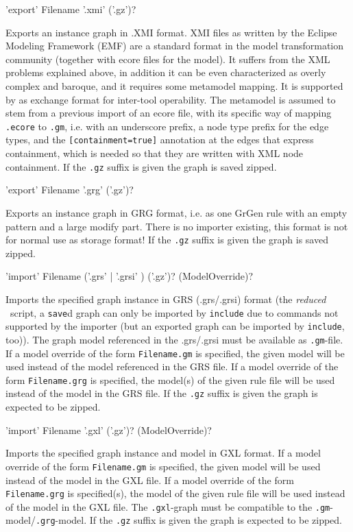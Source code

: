 \begin{rail}
  'export' Filename '.xmi' ('.gz')?
\end{rail}
Exports an instance graph in .XMI format.
XMI files as written by the Eclipse Modeling Framework (EMF) are a standard format in the model transformation community (together with ecore files for the model).
It suffers from the XML problems explained above, in addition it can be even characterized as overly complex and baroque, and it requires some metamodel mapping.
It is supported by \GrG{} as exchange format for inter-tool operability.
The metamodel is assumed to stem from a previous import of an ecore file, with its specific way of mapping \texttt{.ecore} to \texttt{.gm}, i.e. with an underscore prefix, a node type prefix for the edge types, and the \verb#[containment=true]# annotation at the edges that express containment, which is needed so that they are written with XML node containment.
If the \texttt{.gz} suffix is given the graph is saved zipped.


\begin{rail}
  'export' Filename '.grg' ('.gz')?
\end{rail}
Exports an instance graph in GRG format, i.e. as one GrGen rule with an empty pattern and a large modify part.
There is no importer existing, this format is not for normal use as storage format!
If the \texttt{.gz} suffix is given the graph is saved zipped.

\begin{rail}
  'import' Filename ('.grs' | '.grsi' ) ('.gz')? (ModelOverride)?
\end{rail}
Imports the specified graph instance in GRS (.grs/.grsi) format (the \emph{reduced} \GrShell\ script,
a \texttt{save}d graph can only be imported by \texttt{include} due to commands not supported by the importer (but an exported graph can be imported by \texttt{include}, too)).
The graph model referenced in the .grs/.grsi must be available as \texttt{.gm}-file.
If a model override of the form \texttt{Filename.gm} is specified, the given model will be used instead of the model referenced in the GRS file.
If a model override of the form \texttt{Filename.grg} is specified, the model(s) of the given rule file will be used instead of the model in the GRS file.
If the \texttt{.gz} suffix is given the graph is expected to be zipped.

\begin{rail}
  'import' Filename '.gxl' ('.gz')? (ModelOverride)?
\end{rail}
Imports the specified graph instance and model in GXL format.
If a model override of the form \texttt{Filename.gm} is specified, the given model will be used instead of the model in the GXL file.
If a model override of the form \texttt{Filename.grg} is specified(s), the model of the given rule file will be used instead of the model in the GXL file.
The \texttt{.gxl}-graph must be compatible to the \texttt{.gm}-model/\texttt{.grg}-model.
If the \texttt{.gz} suffix is given the graph is expected to be zipped.

